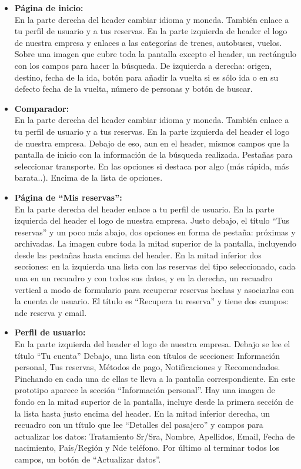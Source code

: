 \begin{itemize}
    \item\textbf{Página de inicio:} \\ En la parte derecha del header cambiar idioma y moneda. También enlace a tu perfil de usuario y a tus reservas. 
    En la parte izquierda de header el logo de nuestra empresa y enlaces a las categorías de trenes, autobuses, vuelos.
    Sobre una imagen que cubre toda la pantalla excepto el header, un rectángulo con los campos para hacer la búsqueda. De izquierda a derecha: origen, destino, fecha de la ida, botón para añadir la vuelta si es sólo ida o en su defecto fecha de la vuelta, número de personas y botón de buscar. 
    
    \item\textbf{Comparador:} \\ En la parte derecha del header cambiar idioma y moneda. También enlace a tu perfil de usuario y a tus reservas. 
    En la parte izquierda del header el logo de nuestra empresa.
    Debajo de eso, aun en el header, mismos campos que la pantalla de inicio con la información de la búsqueda realizada.
    Pestañas para seleccionar transporte.
    En las opciones si destaca por algo (más rápida, más barata..).
    Encima de la lista de opciones.

    \item\textbf{Página de ``Mis reservas'':} \\ En la parte derecha del header enlace a tu perfil de usuario. En la parte izquierda del header el logo de nuestra empresa.
    Justo debajo, el título “Tus reservas” y un poco más abajo, dos opciones en forma de pestaña: próximas y archivadas.
    La imagen cubre toda la mitad superior de la pantalla, incluyendo desde las pestañas hasta encima del header.
    En la mitad inferior dos secciones: en la izquierda una lista con las reservas del tipo seleccionado, cada una en un recuadro y con todos sus datos, y en la derecha, un recuadro vertical a modo de formulario para recuperar reservas hechas y asociarlas con la cuenta de usuario. El título es “Recupera tu reserva” y tiene dos campos: n\textdegree de reserva y email.
    
    \item\textbf{Perfil de usuario:} \\ En la parte izquierda del header el logo de nuestra empresa. 
    Debajo se lee el título “Tu cuenta”
    Debajo, una lista con títulos de secciones: Información personal, Tus reservas, Métodos de pago, Notificaciones y Recomendados. Pinchando en cada una de ellas te lleva a la pantalla correspondiente. En este prototipo aparece la sección “Información personal”.
    Hay una imagen de fondo en la mitad superior de la pantalla, incluye desde la primera sección de la lista hasta justo encima del header.
    En la mitad inferior derecha, un recuadro con un título que lee “Detalles del pasajero” y campos para actualizar los datos: Tratamiento Sr/Sra, Nombre, Apellidos, Email, Fecha de nacimiento, País/Región y N\textdegree de teléfono. Por último al terminar todos los campos, un botón de “Actualizar datos”.
    
    
\end{itemize}


